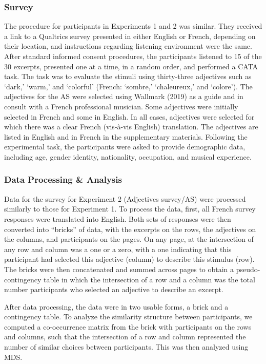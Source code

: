 \documentclass[
  english,
  man,floatsintext]{apa6}
\begin{document}
\hypertarget{survey-1}{%
\subsubsection{Survey}\label{survey-1}}

The procedure for participants in Experiments 1 and 2 was similar. They received a link to a Qualtrics survey presented in either English or French, depending on their location, and instructions regarding listening environment were the same. After standard informed consent procedures, the participants listened to 15 of the 30 excerpts, presented one at a time, in a random order, and performed a CATA task. The task was to evaluate the stimuli using thirty-three adjectives such as `dark,' `warm,' and `colorful' (French: `sombre,' `chaleureux,' and `colore'). The adjectives for the AS were selected using Wallmark (2019) as a guide and in consult with a French professional musician. Some adjectives were initially selected in French and some in English. In all cases, adjectives were selected for which there was a clear French (vis-à-vis English) translation. The adjectives are listed in English and in French in the supplementary materials. Following the experimental task, the participants were asked to provide demographic data, including age, gender identity, nationality, occupation, and musical experience.

\hypertarget{data-processing-analysis}{%
\subsubsection{Data Processing \& Analysis}\label{data-processing-analysis}}

Data for the survey for Experiment 2 (Adjectives survey/AS) were processed similarly to those for Experiment 1. To process the data, first, all French survey responses were translated into English. Both sets of responses were then converted into ``bricks'' of data, with the excerpts on the rows, the adjectives on the columns, and participants on the pages. On any page, at the intersection of any row and column was a one or a zero, with a one indicating that this participant had selected this adjective (column) to describe this stimulus (row). The bricks were then concatenated and summed across pages to obtain a pseudo-contingency table in which the intersection of a row and a column was the total number participants who selected an adjective to describe an excerpt.

After data processing, the data were in two usable forms, a brick and a contingency table. To analyze the similarity structure between participants, we computed a co-occurrence matrix from the brick with participants on the rows and columns, such that the intersection of a row and column represented the number of similar choices between participants. This was then analyzed using MDS.
\end{document}
